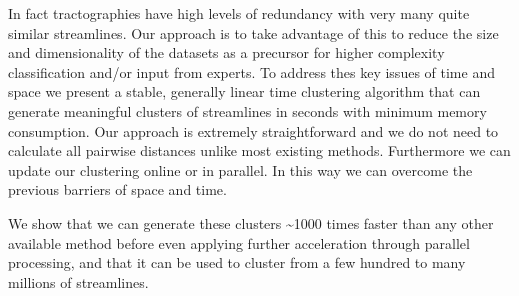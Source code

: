 \documentclass{bioinfo}
\begin{document}
In fact tractographies have high levels of redundancy with very many
quite similar streamlines. Our approach is to take advantage of this to
reduce the size and dimensionality of the datasets as a precursor for
higher complexity classification and/or input from experts. To address
thes key issues of time and space we present a stable, generally linear
time clustering algorithm that can generate meaningful clusters of
streamlines in seconds with minimum memory consumption. Our approach is
extremely straightforward and we do not need to calculate all pairwise
distances unlike most existing methods. Furthermore we can update our
clustering online or in parallel. In this way we can overcome the
previous barriers of space and time.

We show that we can generate these clusters \textasciitilde1000 times
faster than any other available method before even applying further
acceleration through parallel processing, and that it can be used to
cluster from a few hundred to many millions of streamlines.



\end{document}
